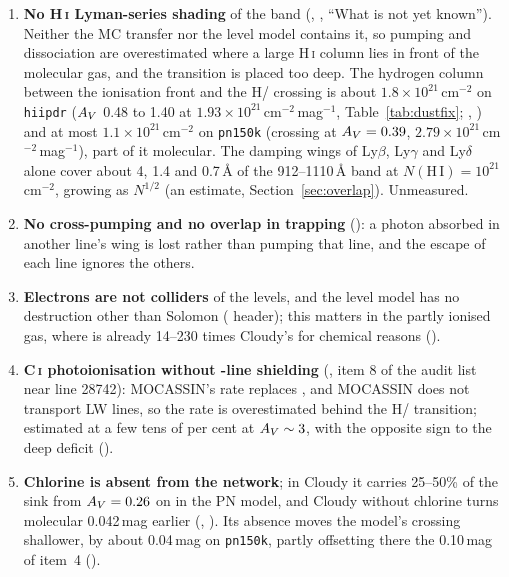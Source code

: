 \begin{enumerate}
  largest single identified term and should accompany any comparison with
  Cloudy, which uses the total decay rate for every species but \Htwo{}
  ().
\item \textbf{No H\,\textsc{i} Lyman-series shading} of the \Htwo{} band
  (, , ``What is not yet known''). Neither the MC transfer
  nor the level model contains it, so pumping and dissociation are
  overestimated where a large H\,\textsc{i} column lies in front of the molecular
  gas, and the transition is placed too deep. The hydrogen column between the
  ionisation front and the H/\Htwo{} crossing is about $1.8\times10^{21}$\,cm$^{-2}$ on
  \texttt{hiipdr} ($A_{V}$ 0.48 to 1.40 at $1.93\times10^{21}$\,cm$^{-2}$\,mag$^{-1}$,
  Table~\ref{tab:dustfix}; , ) and at most
  $1.1\times10^{21}$\,cm$^{-2}$ on \texttt{pn150k} (crossing at $A_{V}=0.39$,
  $2.79\times10^{21}$\,cm$^{-2}$\,mag$^{-1}$), part of it molecular. The damping wings
  of Ly$\beta$, Ly$\gamma$ and Ly$\delta$ alone cover about 4, 1.4 and 0.7\,\AA{} of the
  912--1110\,\AA{} band at $N(\mathrm{H\,I})=10^{21}$\,cm$^{-2}$, growing as $N^{1/2}$
  (an estimate, Section~\ref{sec:overlap}). Unmeasured.
\item \textbf{No cross-pumping and no overlap in trapping} (): a
  photon absorbed in another line's wing is lost rather than pumping that
  line, and the escape of each line ignores the others.
\item \textbf{Electrons are not colliders} of the \Htwo{} levels, and the level
  model has no destruction other than Solomon ( header); this
  matters in the partly ionised gas, where \Htwo{} is already 14--230 times
  Cloudy's for chemical reasons ().
\item \textbf{C\,\textsc{i} photoionisation without \Htwo-line shielding}
  (, item 8 of the audit list near line 28742): MOCASSIN's rate
  replaces , and MOCASSIN does not transport LW lines, so the
  rate is overestimated behind the H/\Htwo{} transition; estimated at a few
  tens of per cent at $A_{V}\sim3$, with the opposite sign to the deep \Cp{}
  deficit ().
\item \textbf{Chlorine is absent from the network}; in Cloudy it carries 25--50\%
  of the \Htwo{} sink from $A_{V}=0.26$ on in the PN model, and Cloudy without
  chlorine turns molecular 0.042\,mag earlier (, ). Its
  absence moves the model's crossing shallower, by about 0.04\,mag on
  \texttt{pn150k}, partly offsetting there the 0.10\,mag of item~4 ().

\end{enumerate}
